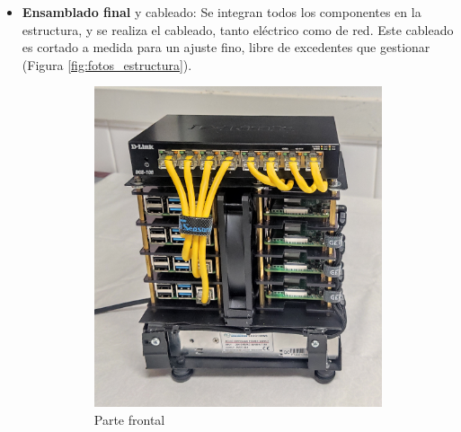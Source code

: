 \begin{itemize}
    \item \textbf{Ensamblado final} y cableado: Se integran todos los componentes en la estructura, y se realiza el cableado, tanto eléctrico como de red. Este cableado es cortado a medida para un ajuste fino, libre de excedentes que gestionar (Figura \ref{fig:fotos_estructura}).

    \begin{figure}[h!]
    \centering
    \begin{subfigure}[c]{0.4\textwidth}
        \includegraphics[width=\textwidth]{img/fotos_estructura/front.jpg}
        \caption{Parte frontal}
        \label{fig:fotos_estructura_front}
    \end{subfigure}
    \begin{subfigure}[c]{0.4\textwidth}

\end{subfigure}
\end{figure}
\end{itemize}

